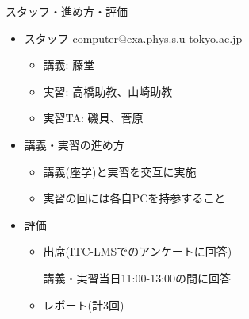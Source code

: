 \begin{frame}[t,fragile]{スタッフ・進め方・評価}
  \begin{itemize}
  \item スタッフ \href{mailto:computer@exa.phys.s.u-tokyo.ac.jp}{computer@exa.phys.s.u-tokyo.ac.jp}
    \begin{itemize}
    \item 講義: 藤堂
    \item 実習: 高橋助教、山崎助教
    \item 実習TA: 磯貝、菅原
    \end{itemize}
  \item 講義・実習の進め方
    \begin{itemize}
    \item 講義(座学)と実習を交互に実施
    \item 実習の回には各自PCを持参すること
    \end{itemize}
  \item 評価
    \begin{itemize}
    \item 出席(ITC-LMSでのアンケートに回答)

      講義・実習当日11:00-13:00の間に回答
      
    \item レポート(計3回)
    \end{itemize}    
  \end{itemize}    
\end{frame}

